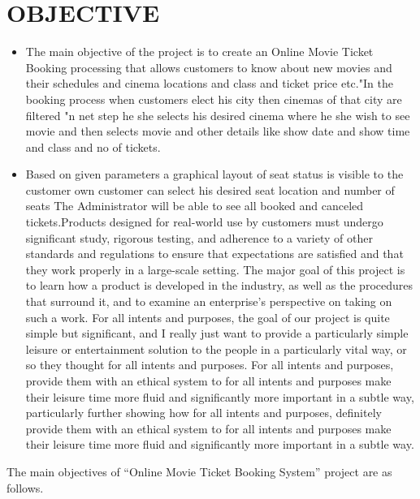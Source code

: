 \documentclass[oneside,a4paper,12pt]{report}
\begin{document}
\section{OBJECTIVE}
 \begin{itemize}
\item The main objective of the project is to create an Online Movie Ticket Booking processing that allows customers to know about new movies and their schedules and cinema locations and class and ticket price etc."In the booking process when customers elect his city then cinemas of that city are filtered "n net step he she selects his desired cinema where he she wish to see movie and then selects movie and other details like show date and show time and class and no of tickets. 
\item Based on given parameters a graphical layout of seat status is visible to the customer own customer can select his desired seat location and number of seats The Administrator will be able to see all booked and canceled tickets.Products designed for real-world use by customers must undergo significant study, rigorous testing, and adherence to a variety of other standards and regulations to ensure that expectations are satisfied and that they work properly in a large-scale setting. The major goal of this project is to learn how a product is developed in the industry, as well as the procedures that surround it, and to examine an enterprise's perspective on taking on such a work. For all intents and purposes, the goal of our project is quite simple but significant, and I really just want to provide a particularly simple leisure or entertainment solution to the people in a particularly vital way, or so they thought for all intents and purposes. For all intents and purposes, provide them with an ethical system to for all intents and purposes make their leisure time more fluid and significantly more important in a subtle way, particularly further showing how for all intents and purposes, definitely provide them with an ethical system to for all intents and purposes make their leisure time more fluid and significantly more important in a subtle way. 
 \end{itemize}
 The main objectives of “Online Movie Ticket Booking System” project are as follows. 
\end{document}
